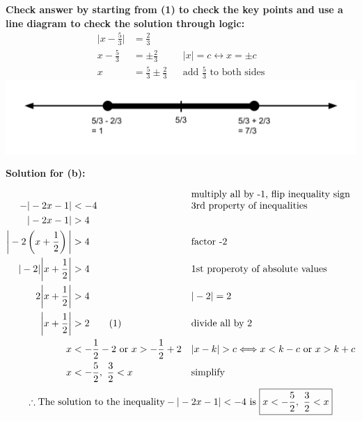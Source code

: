 \documentclass[12pt]{book}
\newcommand\numberthis{\addtocounter{equation}{1}\tag{\theequation}}
\begin{document}
\begin{enumerate}
\vspace{0.5em}
\textbf{Check answer by starting from (1) to check the key points and use a line diagram to check the solution through logic:}
\vspace{0.2em}
\addtolength{\jot}{0em}
\begin{align*}
    \bigg|x - \frac{5}{3} \bigg| & = \frac{2}{3}\\
    x - \frac{5}{3} & = \pm \frac{2}{3} && |x| = c \longleftrightarrow x = \pm c\\
    x & = \frac{5}{3} \pm \frac{2}{3} && \text{add $\frac{5}{3}$ to both sides}
\end{align*}
\includegraphics[width=\linewidth]{A1-2 proof 1 (1).png}

\clearpage
\vspace{0.3cm} 
\textbf{Solution for (b):}
\vspace{-1.5em}

\addtolength{\jot}{0.3em}
\begin{align*}
    -|-2x-1| & < -4 && \text{\shortstack[l]{multiply all by -1, flip inequality sign \\ 3rd property of inequalities}} \\
    |-2x-1| & > 4 \\
    \bigg|-2 \left( x+\frac{1}{2} \right) \bigg| & > 4 && \text{factor -2} \\
    |-2|\bigg|x+\frac{1}{2}\bigg| & > 4 && \text{1st properoty of absolute values} \\
    2\bigg|x+\frac{1}{2}\bigg| & > 4 && |-2| = 2 \\
    \bigg|x+\frac{1}{2}\bigg| & > 2  \numberthis && \text{divide all by 2} \\
    x & < -\frac{1}{2} - 2 \text{ or } x > -\frac{1}{2} + 2 && |x-k| > c \Longleftrightarrow x < k-c \text{ or } x > k+c \\
    x & < -\frac{5}{2}, \text{\space} \frac{3}{2} < x && \text{simplify}
\end{align*}
$$ \therefore \text{The solution to the inequality} -|-2x-1| < -4 \text{ is } \boxed{x < -\frac{5}{2}, \text{\space} \frac{3}{2} < x} $$


\end{enumerate}
\end{document}
